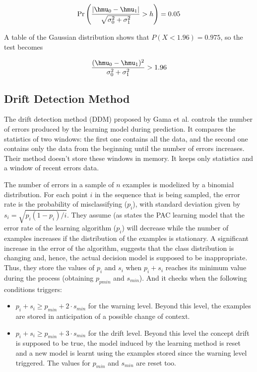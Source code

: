 $$\Pr \left( \frac{|\hmu_0 - \hmu_1|}{\sqrt{\sigma_0^2+ \sigma_1^2}} > h \right) = 0.05$$

A table of the Gaussian distribution shows that $P( X< 1.96) = 0.975$, so the test becomes

$$\frac{(\hmu_0 - \hmu_1)^ 2}{{\sigma_0^2+ \sigma_1^2}} > 1.96$$

\subsection{Drift Detection Method}
\label{SsDDM}

The drift detection method (DDM) proposed by Gama et al.  \cite{Gama} controls the number of errors produced by
the learning model during prediction. %
It compares the statistics of two windows: the first one contains all the data, and the second one contains only the data from the beginning until the number of errors increases. Their method doesn't store these windows in memory. It keeps only statistics and a window of recent errors data.%

The number of errors in a sample of $n$ examples is modelized by a binomial distribution. For each point $i$ in the sequence
that is being sampled, the error rate is the probability of misclassifying ($p_i$),
with standard deviation given by $s_i = \sqrt{p_i(1 - p_i)/i}$. They assume (as states the
PAC learning model \cite{Mitchell} that the error rate of the learning algorithm ($p_i$) will
decrease while the number of examples increases if the distribution of the examples is stationary. A significant increase in the error of the algorithm, suggests
that the class distribution is changing and, hence, the actual decision model is
supposed to be inappropriate. Thus, they store the values of $p_i$ and $s_i$ when
$p_i+s_i$ reaches its minimum value during the process (obtaining $p_{pmin}$ and $s_{min}$).
And it checks when the following conditions triggers:
\begin{itemize}
\item $p_i + s_i \geq p_{min} + 2 \cdot s_{min}$ for the warning level. Beyond this level, the examples are stored in anticipation of a possible change of context.

\item $p_i + s_i \geq p_{min} + 3 \cdot s_{min}$ for the drift level. Beyond this level the concept drift is supposed to be true, the model induced by the learning method is reset and a new model is learnt using the examples stored since the warning level triggered. The values for $p_{min}$ and $s_{min}$ are reset too.

\end{itemize}

